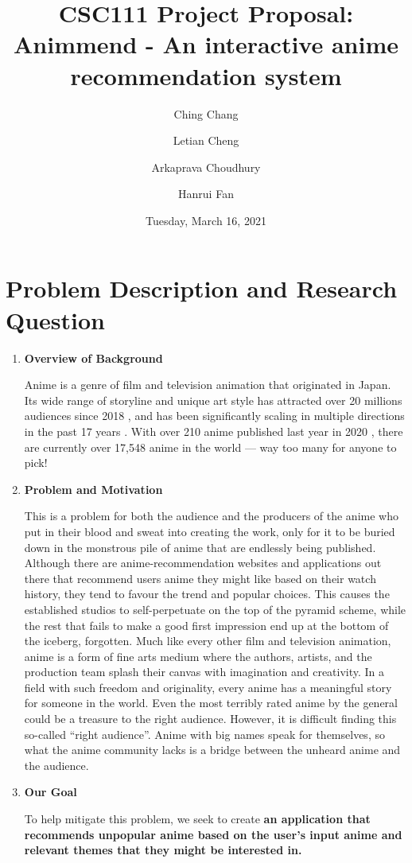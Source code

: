\documentclass[fontsize=11pt]{article}
\title{CSC111 Project Proposal:\\\textbf{Animmend - An interactive anime recommendation system}}
\author{
  Ching Chang\\
  \and
  Letian Cheng\\
  \and
  Arkaprava Choudhury\\
  \and
  Hanrui Fan
}
\date{Tuesday, March 16, 2021}
\begin{document}
\maketitle

\section*{Problem Description and Research Question}
\begin{enumerate}
    \item \textbf{Overview of Background}
    
    \quad Anime is a genre of film and television animation that originated in Japan. Its wide range of storyline and unique art style has attracted over 20 millions audiences since 2018 \citep{Ani18}, and has been significantly scaling in multiple directions in the past 17 years \citep{Ell18}. With over 210 anime published last year in 2020 \citep{wiki21}, there are currently over 17,548 anime in the world \citep{MyA21} — way too many for anyone to pick!
    
    \item \textbf{Problem and Motivation}
    
    \quad This is a problem for both the audience and the producers of the anime who put in their blood and sweat into creating the work, only for it to be buried down in the monstrous pile of anime that are endlessly being published. Although there are anime-recommendation websites and applications out there that recommend users anime they might like based on their watch history, they tend to favour the trend and popular choices. This causes the established studios to self-perpetuate on the top of the pyramid scheme, while the rest that fails to make a good first impression end up at the bottom of the iceberg, forgotten. Much like every other film and television animation, anime is a form of fine arts medium where the authors, artists, and the production team splash their canvas with imagination and creativity. In a field with such freedom and originality, every anime has a meaningful story for someone in the world. Even the most terribly rated anime by the general could be a treasure to the right audience. However, it is difficult finding this so-called “right audience”. Anime with big names speak for themselves, so what the anime community lacks is a bridge between the unheard anime and the audience.
    
    \item \textbf{Our Goal}
    
    \quad To help mitigate this problem, we seek to create \textbf{an application that recommends unpopular anime based on the user’s input anime and relevant themes that they might be interested in.}
\end{enumerate}
\end{document}
